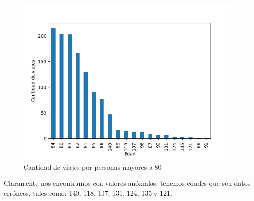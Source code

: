 \begin{enumerate}
\begin{itemize}
\begin{figure}[H]
    \includegraphics[scale=0.8]{imagenes/edadMayores.png}
    \caption{Cantidad de viajes por personas mayores a 80}
 \label{fig: cluster}
\end{figure}
Claramente nos encontramos con valores anómalos, tenemos edades que son datos erróneos, tales como: 140, 118, 107, 131, 124, 135 y 121.
        \end{itemize}    
\end{enumerate}

